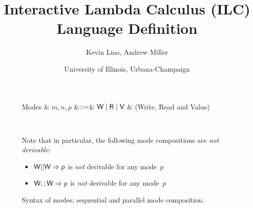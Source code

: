 \documentclass[10pt]{article}
\begin{document}
\title{Interactive Lambda Calculus (ILC) Language Definition}
\author{Kevin Liao, Andrew Miller}
\date{University of Illinois, Urbana-Champaign}

\maketitle
\thispagestyle{empty}

\begin{figure}[htbp]
{
  \centering

\begin{grammar}
  Modes & $m,n,p$ &$\mathrel{::=}$& $\textsf{W} \mathrel{\mid} \textsf{R} \mathrel{\mid} \textsf{V}$ & (Write, Read and Value) 
\end{grammar}

\\[2mm]
}
Note that in particular, the following mode compositions are \emph{not derivable}:
\begin{itemize}
\item $\textsf{W} || \textsf{W} => p$ is \emph{not} derivable for any mode~$p$
\item $\textsf{W} ;; \textsf{W} => p$ is \emph{not} derivable for any mode~$p$
\end{itemize}
\caption{Syntax of modes; sequential and parallel mode composition.}
\label{fig:expr}
\end{figure}
\end{document}
